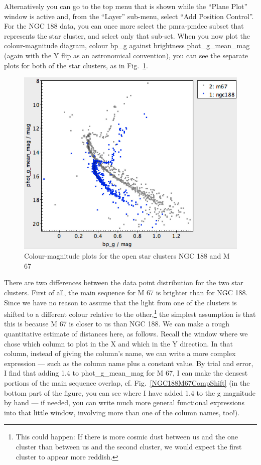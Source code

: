 \documentclass[twocolumn,apj]{openjournal}
\begin{document}
Alternatively you can go to the top menu that is shown while the ``Plane Plot'' window is active and, from the ``Layer'' sub-menu, select ``Add Position Control''. For the NGC 188 data, you can once more select the pmra-pmdec subset that represents the star cluster, and select only that sub-set. When you now plot the colour-magnitude diagram,  colour bp\_g against brightness phot\_g\_mean\_mag (again with the Y flip as an astronomical convention), you can see the separate plots for both of the star clusters, as in Fig.~\ref{NGC188M67Comp}.
\begin{figure}[htbp]
\begin{center}
\includegraphics[width=\linewidth]{ngc188m67comp.jpg}
\caption{Colour-magnitude plots for the open star clusters NGC 188 and M 67}
\label{NGC188M67Comp}
\end{center}
\end{figure}
There are two differences between the data point distribution for the two star clusters. First of all, the main sequence for M 67 is brighter than for NGC 188. Since we have no reason to assume that the light from one of the clusters is shifted to a different colour relative to the other,\footnote{This could happen: If there is more cosmic dust between us and the one cluster than between us and the second cluster, we would expect the first cluster to appear more reddish.} the simplest assumption is that this is because M 67 is closer to us than NGC 188. We can make a rough quantitative estimate of distances here, as follows. Recall the window where we chose which column to plot in the X and which in the Y direction. In that column, instead of giving the column's name, we can write a more complex expression --- such as the column name plus a constant value. By trial and error, I find that adding 1.4 to phot\_g\_mean\_mag for M 67, I can make the densest portions of the main sequence overlap, cf. Fig.~\ref{NGC188M67CompShift} (in the bottom part of the figure, you can see where I have added 1.4 to the g magnitude by hand --- if needed, you can write much more general functional expressions into that little window, involving more than one of the column names, too!).
\end{document}

